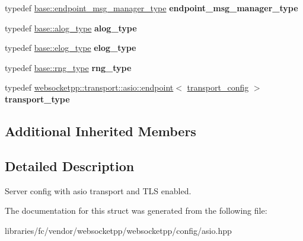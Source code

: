 \begin{DoxyCompactItemize}
\item 
\mbox{\label{structwebsocketpp_1_1config_1_1asio__tls_a7fdb90dbe56e52adc2d99e38d4fc626d}} 
typedef \mbox{\hyperlink{classwebsocketpp_1_1message__buffer_1_1alloc_1_1endpoint__msg__manager}{base\+::endpoint\+\_\+msg\+\_\+manager\+\_\+type}} {\bfseries endpoint\+\_\+msg\+\_\+manager\+\_\+type}
\item 
\mbox{\label{structwebsocketpp_1_1config_1_1asio__tls_a27fcf6498be1a6ab0e81ea117b5a9903}} 
typedef \mbox{\hyperlink{classwebsocketpp_1_1log_1_1basic}{base\+::alog\+\_\+type}} {\bfseries alog\+\_\+type}
\item 
\mbox{\label{structwebsocketpp_1_1config_1_1asio__tls_a81b08cb436d7666730391fc9f3c73de7}} 
typedef \mbox{\hyperlink{structwebsocketpp_1_1config_1_1core_ac037ffb73b675a6251f3b86433b4eb17}{base\+::elog\+\_\+type}} {\bfseries elog\+\_\+type}
\item 
\mbox{\label{structwebsocketpp_1_1config_1_1asio__tls_a4d32d1651cb937c392c4eed71034752e}} 
typedef \mbox{\hyperlink{structwebsocketpp_1_1config_1_1core_a245db33d05f7994d221db66f506ab8c6}{base\+::rng\+\_\+type}} {\bfseries rng\+\_\+type}
\item 
\mbox{\label{structwebsocketpp_1_1config_1_1asio__tls_ad261981514a31011420d9191ff9b80a8}} 
typedef \mbox{\hyperlink{classwebsocketpp_1_1transport_1_1asio_1_1endpoint}{websocketpp\+::transport\+::asio\+::endpoint}}$<$ \mbox{\hyperlink{structwebsocketpp_1_1config_1_1asio__tls_1_1transport__config}{transport\+\_\+config}} $>$ {\bfseries transport\+\_\+type}
\end{DoxyCompactItemize}
\subsection*{Additional Inherited Members}


\subsection{Detailed Description}
Server config with asio transport and T\+LS enabled. 

The documentation for this struct was generated from the following file\+:\begin{DoxyCompactItemize}
\item 
libraries/fc/vendor/websocketpp/websocketpp/config/asio.\+hpp\end{DoxyCompactItemize}
